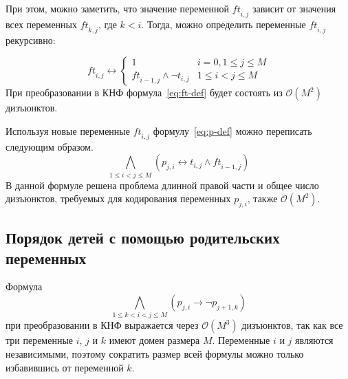 При этом, можно заметить, что значение переменной $\mathit{ft}_{i,j}$ зависит от значения всех переменных $\mathit{ft}_{k,j}$, где $k < i$. Тогда, можно определить переменные $\mathit{ft}_{i,j}$ рекурсивно:

\begin{equation}
\label{eq:ft-def}
  \mathit{ft}_{i,j} \leftrightarrow 
    \begin{cases} 
      1                               & i = 0, 1 \leq j \leq M \\
      \mathit{ft}_{i-1,j} \wedge \neg t_{i,j}  & 1 \leq i < j \leq M
    \end{cases} 
\end{equation}
%
При преобразовании в КНФ формула~\eqref{eq:ft-def} будет состоять из $\mathcal{O}\left(M^{2}\right)$ дизъюнктов.

Используя новые переменные $\mathit{ft}_{i,j}$ формулу~\eqref{eq:p-def} можно переписать следующим образом.
%
\begin{equation}
\label{eq:p-def-tight}
  \bigwedge_{1 \leq i < j \leq M} \left(p_{j,i} \leftrightarrow t_{i,j} \wedge \mathit{ft}_{i-1,j}\right)
\end{equation}
%
В данной формуле решена проблема длинной правой части и общее число дизъюнктов, требуемых для кодирования переменных $p_{j,i}$, также $\mathcal{O}\left(M^{2}\right)$. 


\subsection{Порядок детей с помощью родительских переменных}
\label{sec:space:tight:p-order}


Формула
\begin{equation*}
\bigwedge_{1 \leq k < i < j \leq M} \left(p_{j,i} \rightarrow \neg p_{j + 1, k}\right)
\end{equation*}
при преобразовании в КНФ выражается через $\mathcal{O}\left(M^{3}\right)$ дизъюнктов, так как все три переменные $i$, $j$ и $k$ имеют домен размера $M$.
Переменные $i$ и $j$ являются независимыми, поэтому сократить размер всей формулы можно только избавившись от переменной $k$.

